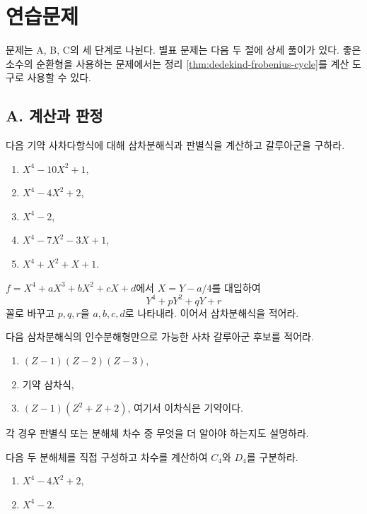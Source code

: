 \clearpage
\section{연습문제}
\label{sec:quartic-quintic-exercises}

문제는 A, B, C의 세 단계로 나뉜다. 별표 문제는 다음 두 절에 상세 풀이가 있다. 좋은 소수의 순환형을 사용하는 문제에서는 정리 \ref{thm:dedekind-frobenius-cycle}를 계산 도구로 사용할 수 있다.

\subsection*{A. 계산과 판정}

\begin{exercise}[*]
다음 기약 사차다항식에 대해 삼차분해식과 판별식을 계산하고 갈루아군을 구하라.
\begin{enumerate}[label=(\alph*)]
  \item $X^4-10X^2+1$,
  \item $X^4-4X^2+2$,
  \item $X^4-2$,
  \item $X^4-7X^2-3X+1$,
  \item $X^4+X^2+X+1$.
\end{enumerate}
\end{exercise}

\begin{exercise}[*]
$f=X^4+aX^3+bX^2+cX+d$에서 $X=Y-a/4$를 대입하여
\[
  Y^4+pY^2+qY+r
\]
꼴로 바꾸고 $p,q,r$을 $a,b,c,d$로 나타내라. 이어서 삼차분해식을 적어라.
\end{exercise}

\begin{exercise}
다음 삼차분해식의 인수분해형만으로 가능한 사차 갈루아군 후보를 적어라.
\begin{enumerate}[label=(\alph*)]
  \item $(Z-1)(Z-2)(Z-3)$,
  \item 기약 삼차식,
  \item $(Z-1)(Z^2+Z+2)$, 여기서 이차식은 기약이다.
\end{enumerate}
각 경우 판별식 또는 분해체 차수 중 무엇을 더 알아야 하는지도 설명하라.
\end{exercise}

\begin{exercise}[*]
다음 두 분해체를 직접 구성하고 차수를 계산하여 $C_4$와 $D_4$를 구분하라.
\begin{enumerate}[label=(\alph*)]
  \item $X^4-4X^2+2$,
  \item $X^4-2$.
\end{enumerate}
\end{exercise}

